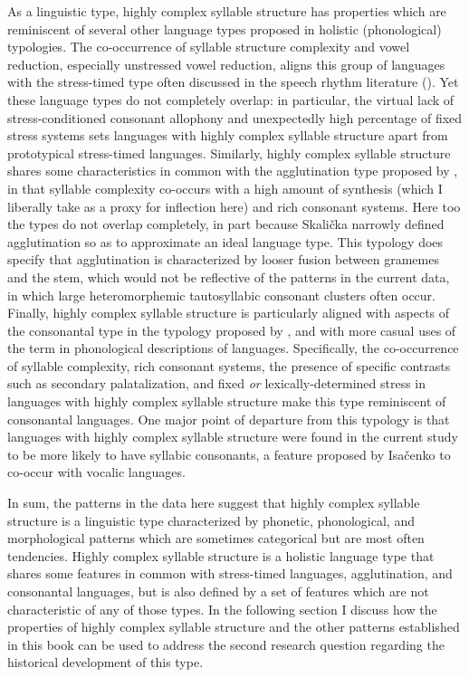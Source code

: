   As a linguistic type, highly complex syllable structure has properties which are reminiscent of several other language types proposed in holistic (phonological) typologies. The co-occurrence of syllable structure complexity and vowel reduction, especially unstressed vowel reduction, aligns this group of languages with the stress-timed type often discussed in the speech rhythm literature (\citealt{Dauer1983,Auer1993,Schiering2007}). Yet these language types do not completely overlap: in particular, the virtual lack of stress-conditioned consonant allophony and unexpectedly high percentage of fixed stress systems sets languages with highly complex syllable structure apart from prototypical stress-timed languages. Similarly, highly complex syllable structure shares some characteristics in common with the agglutination type proposed by \citet{Skalička1979}, in that syllable complexity co-occurs with a high amount of synthesis (which I liberally take as a proxy for inflection here) and rich consonant systems. Here too the types do not overlap completely, in part because Skalička narrowly defined agglutination so as to approximate an ideal language type. This typology does specify that agglutination is characterized by looser fusion between gramemes and the stem, which would not be reflective of the patterns in the current data, in which large heteromorphemic tautosyllabic consonant clusters often occur. Finally, highly complex syllable structure is particularly aligned with aspects of the consonantal type in the typology proposed by \citet{Isačenko1939/1940}, and with more casual uses of the term in phonological descriptions of languages. Specifically, the co-occurrence of syllable complexity, rich consonant systems, the presence of specific contrasts such as secondary palatalization, and fixed \textit{or} lexically-determined stress in languages with highly complex syllable structure make this type reminiscent of consonantal languages. One major point of departure from this typology is that languages with highly complex syllable structure were found in the current study to be more likely to have syllabic consonants, a feature proposed by Isačenko to co-occur with vocalic languages.

  In sum, the patterns in the data here suggest that highly complex syllable structure is a linguistic type characterized by phonetic, phonological, and morphological patterns which are sometimes categorical but are most often tendencies. Highly complex syllable structure is a holistic language type that shares some features in common with stress-timed languages, agglutination, and consonantal languages, but is also defined by a set of features which are not characteristic of any of those types. In the following section I discuss how the properties of highly complex syllable structure and the other patterns established in this book can be used to address the second research question regarding the historical development of this type.

